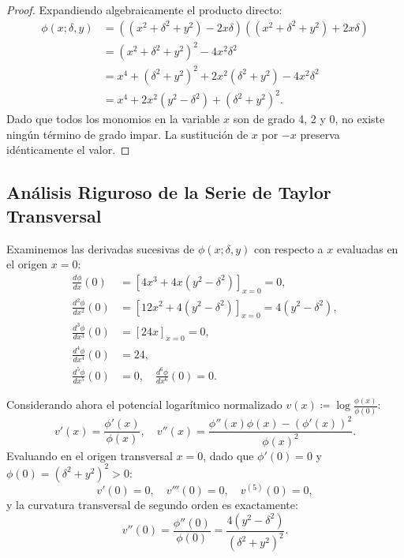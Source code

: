 \documentclass[11pt,a4paper]{article}
\theoremstyle{definition}
\theoremstyle{remark}
\begin{document}
\begin{proof}
Expandiendo algebraicamente el producto directo:
\begin{align}
\phi(x; \delta, y) &= \left( (x^2 + \delta^2 + y^2) - 2x\delta \right) \left( (x^2 + \delta^2 + y^2) + 2x\delta \right) \nonumber \\
&= (x^2 + \delta^2 + y^2)^2 - 4x^2\delta^2 \nonumber \\
&= x^4 + (\delta^2 + y^2)^2 + 2x^2(\delta^2 + y^2) - 4x^2\delta^2 \nonumber \\
&= x^4 + 2x^2(y^2 - \delta^2) + (\delta^2 + y^2)^2.
\end{align}
Dado que todos los monomios en la variable $x$ son de grado 4, 2 y 0, no existe ningún término de grado impar. La sustitución de $x$ por $-x$ preserva idénticamente el valor.
\end{proof}

\subsection{Análisis Riguroso de la Serie de Taylor Transversal}

Examinemos las derivadas sucesivas de $\phi(x; \delta, y)$ con respecto a $x$ evaluadas en el origen $x = 0$:
\begin{align}
\frac{d\phi}{dx}(0) &= \left[ 4x^3 + 4x(y^2 - \delta^2) \right]_{x=0} = 0, \\
\frac{d^2\phi}{dx^2}(0) &= \left[ 12x^2 + 4(y^2 - \delta^2) \right]_{x=0} = 4(y^2 - \delta^2), \\
\frac{d^3\phi}{dx^3}(0) &= \left[ 24x \right]_{x=0} = 0, \\
\frac{d^4\phi}{dx^4}(0) &= 24, \\
\frac{d^5\phi}{dx^5}(0) &= 0, \quad \frac{d^6\phi}{dx^6}(0) = 0.
\end{align}

Considerando ahora el potencial logarítmico normalizado $v(x) \coloneqq \log \frac{\phi(x)}{\phi(0)}$:
\begin{equation}
v'(x) = \frac{\phi'(x)}{\phi(x)}, \quad v''(x) = \frac{\phi''(x)\phi(x) - (\phi'(x))^2}{\phi(x)^2}.
\end{equation}
Evaluando en el origen transversal $x = 0$, dado que $\phi'(0) = 0$ y $\phi(0) = (\delta^2 + y^2)^2 > 0$:
\begin{equation}
v'(0) = 0, \quad v'''(0) = 0, \quad v^{(5)}(0) = 0,
\end{equation}
y la curvatura transversal de segundo orden es exactamente:
\begin{equation}
v''(0) = \frac{\phi''(0)}{\phi(0)} = \frac{4(y^2 - \delta^2)}{(\delta^2 + y^2)^2}.
\end{equation}
\end{document}
